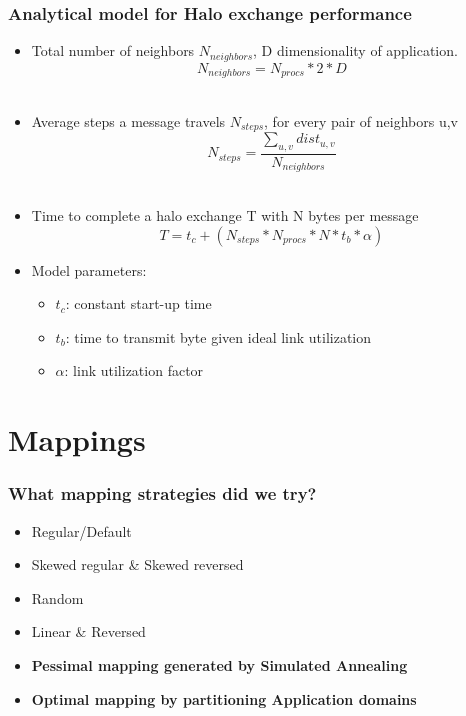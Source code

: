\documentclass{beamer}
\begin{document}
\begin{frame}[shrink=5]
\frametitle{Analytical model for Halo exchange performance}
\begin{itemize}
\item Total number of neighbors $N_{neighbors}$, D dimensionality of application.
\begin{equation}
  N_{neighbors} = N_{procs} * 2 * D
\end{equation} \\
\item Average steps a message travels $N_{steps}$, for every pair of neighbors {u,v}
\begin{equation}
  N_{steps} = \frac{ \sum\limits_{u,v} dist_{u,v} } {N_{neighbors}}
\end{equation} \\
\item Time to complete a halo exchange T with N bytes per message
\begin{equation}
  T = t_c + (N_{steps} * N_{procs} * N * t_b * \alpha)
\end{equation}
\item Model parameters:
\begin{itemize}
  \item $t_c$: constant start-up time
  \item $t_b$: time to transmit byte given ideal link utilization
  \item $\alpha$: link utilization factor
\end{itemize}
\end{itemize}
\end{frame}

\section{Mappings}
\begin{frame}
\frametitle{What mapping strategies did we try?}
\begin{itemize}
\item Regular/Default
\item Skewed regular \& Skewed reversed
\item Random
\item Linear \& Reversed
\item \textbf{Pessimal mapping generated by Simulated Annealing}
\item \textbf{Optimal mapping by partitioning Application domains}
\end{itemize}
\end{frame}
\end{document}
